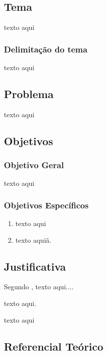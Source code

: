 \chapter*[]{}

\section{Tema}

texto aqui

\subsection{Delimitação do tema}

texto aqui

\section{Problema}

texto aqui


\section{Objetivos}
\subsection{Objetivo Geral}
texto aqui

\subsection{Objetivos Específicos}
\begin{enumerate}
\item texto aqui
\item texto aquiã.
\end{enumerate}

\section{Justificativa}

Segundo , texto aqui....

 texto aqui.

texto aqui
\section{Referencial Teórico}

